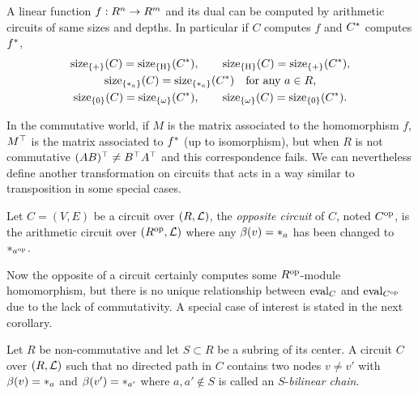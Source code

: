 \begin{corollary}
  A linear function $f:R^n\rightarrow R^m$ and its dual can be computed by
  arithmetic circuits of same sizes and depths. In particular if $C$
  computes $f$ and $C^\ast$ computes $f^\ast$,
  \begin{gather*}
    \operatorname{size}_{\{+\}}(C) = \operatorname{size}_{\{\operatorname{H}\}}(C^\ast), \qquad  
    \operatorname{size}_{\{\operatorname{H}\}}(C) = \operatorname{size}_{\{+\}}(C^\ast), \\
    \operatorname{size}_{\{*_{a}\}}(C) = \operatorname{size}_{\{*_{a}\}}(C^\ast)\quad\text{for any $a\in R$},\\
    \operatorname{size}_{\{0\}}(C) = \operatorname{size}_{\{\omega\}}(C^\ast), \qquad 
    \operatorname{size}_{\{\omega\}}(C) = \operatorname{size}_{\{0\}}(C^\ast).
  \end{gather*}
\end{corollary}

In the commutative world, if $M$ is the matrix associated to the
homomorphism $f$, $M^\top$ is the matrix associated to $f^\ast$
(up to isomorphism), but when $R$ is not commutative
$(AB)^\top\ne B^\top A^\top$ and this correspondence fails. We
can nevertheless define another transformation on circuits that acts
in a way similar to transposition in some special cases.

\begin{definition}
  Let $C=(V,E)$ be a circuit over $(R,\mathcal{L})$, the \emph{opposite
    circuit} of $C$, noted $C^{\mathrm{op}}$, is the arithmetic circuit over
  $(R^{\mathrm{op}},\mathcal{L})$ where any $\beta(v)=*_{a}$ has been changed to $*_{a^{\mathrm{op}}}$.
\end{definition}

Now the opposite of a circuit certainly computes some $R^{\mathrm{op}}$-module
homomorphism, but there is no unique relationship between $\operatorname{eval}_C$
and $\operatorname{eval}_{C^{\mathrm{op}}}$ due to the lack of commutativity. A special case
of interest is stated in the next corollary.

\begin{definition}
  Let $R$ be non-commutative and let $S\subset R$ be a subring of its
  center. A circuit $C$ over $(R,\mathcal{L})$ such that no directed path
  in $C$ contains two nodes $v\ne v'$ with $\beta(v)=*_{a}$ and
  $\beta(v')=*_{a'}$ where $a,a'\not\in S$ is called an
  $S$-\emph{bilinear chain}.
\end{definition}


